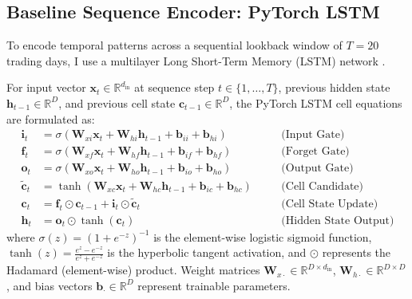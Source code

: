 \subsection{Baseline Sequence Encoder: PyTorch LSTM}
\label{subsec:ch3_lstm}

To encode temporal patterns across a sequential lookback window of $T = 20$ trading days, I use a multilayer Long Short-Term Memory (LSTM) network \citep{hochreiter1997long}.

For input vector $\mathbf{x}_t \in \mathbb{R}^{d_{\text{in}}}$ at sequence step $t \in \{1, \dots, T\}$, previous hidden state $\mathbf{h}_{t-1} \in \mathbb{R}^D$, and previous cell state $\mathbf{c}_{t-1} \in \mathbb{R}^D$, the PyTorch LSTM cell equations are formulated as:
\begin{align}
\mathbf{i}_t &= \sigma\left( \mathbf{W}_{xi} \mathbf{x}_t + \mathbf{W}_{hi} \mathbf{h}_{t-1} + \mathbf{b}_{ii} + \mathbf{b}_{hi} \right) \quad &&\text{(Input Gate)} \label{eq:ch3_lstm_input_gate} \\
\mathbf{f}_t &= \sigma\left( \mathbf{W}_{xf} \mathbf{x}_t + \mathbf{W}_{hf} \mathbf{h}_{t-1} + \mathbf{b}_{if} + \mathbf{b}_{hf} \right) \quad &&\text{(Forget Gate)} \label{eq:ch3_lstm_forget_gate} \\
\mathbf{o}_t &= \sigma\left( \mathbf{W}_{xo} \mathbf{x}_t + \mathbf{W}_{ho} \mathbf{h}_{t-1} + \mathbf{b}_{io} + \mathbf{b}_{ho} \right) \quad &&\text{(Output Gate)} \label{eq:ch3_lstm_output_gate} \\
\tilde{\mathbf{c}}_t &= \tanh\left( \mathbf{W}_{xc} \mathbf{x}_t + \mathbf{W}_{hc} \mathbf{h}_{t-1} + \mathbf{b}_{ic} + \mathbf{b}_{hc} \right) \quad &&\text{(Cell Candidate)} \label{eq:ch3_lstm_cell_cand} \\
\mathbf{c}_t &= \mathbf{f}_t \odot \mathbf{c}_{t-1} + \mathbf{i}_t \odot \tilde{\mathbf{c}}_t \quad &&\text{(Cell State Update)} \label{eq:ch3_lstm_cell_update} \\
\mathbf{h}_t &= \mathbf{o}_t \odot \tanh(\mathbf{c}_t) \quad &&\text{(Hidden State Output)} \label{eq:ch3_lstm_hidden_update}
\end{align}
where $\sigma(z) = (1 + e^{-z})^{-1}$ is the element-wise logistic sigmoid function, $\tanh(z) = \frac{e^z - e^{-z}}{e^z + e^{-z}}$ is the hyperbolic tangent activation, and $\odot$ represents the Hadamard (element-wise) product. Weight matrices $\mathbf{W}_{x\cdot} \in \mathbb{R}^{D \times d_{\text{in}}}$, $\mathbf{W}_{h\cdot} \in \mathbb{R}^{D \times D}$, and bias vectors $\mathbf{b}_{\cdot} \in \mathbb{R}^D$ represent trainable parameters.


